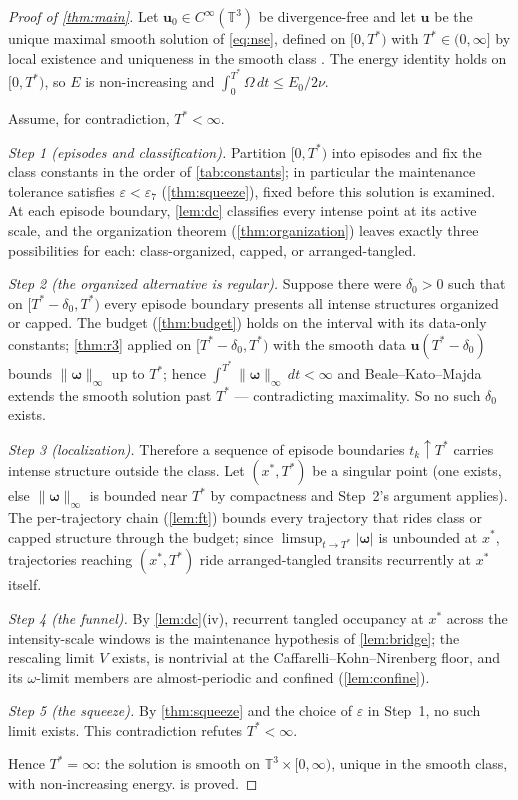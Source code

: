 \documentclass[11pt,letterpaper]{amsart}
\theoremstyle{definition}
\theoremstyle{remark}
\newcommand{\TT}{\mathbb{T}}
\newcommand{\om}{\omega}
\newcommand{\vort}{\boldsymbol{\omega}}
\newcommand{\uu}{\boldsymbol{u}}
\newcommand{\norm}[1]{\lVert #1 \rVert}
\newcommand{\abs}[1]{\lvert #1 \rvert}
\begin{document}
\begin{proof}[Proof of \cref{thm:main}]
Let $\uu_0\in C^\infty(\TT^3)$ be divergence-free and let $\uu$ be the unique maximal
smooth solution of \eqref{eq:nse}, defined on $[0,T^*)$ with $T^*\in(0,\infty]$ by
local existence and uniqueness in the smooth class
\cite{Leray1934,FujitaKato1964,Kato1984}. The energy identity holds on $[0,T^*)$, so
$E$ is non-increasing and $\int_0^{T^*}\Omega\,dt\le E_0/2\nu$.

Assume, for contradiction, $T^*<\infty$.

\emph{Step 1 (episodes and classification).} Partition $[0,T^*)$ into episodes and
fix the class constants in the order of \cref{tab:constants}; in particular the
maintenance tolerance satisfies $\varepsilon<\varepsilon_7$
(\cref{thm:squeeze}), fixed before this solution is examined. At each episode
boundary, \cref{lem:dc} classifies every intense point at its active scale, and the
organization theorem (\cref{thm:organization}) leaves exactly three possibilities for
each: class-organized, capped, or arranged-tangled.

\emph{Step 2 (the organized alternative is regular).} Suppose there were
$\delta_0>0$ such that on $[T^*-\delta_0,T^*)$ every episode boundary presents all
intense structures organized or capped. The budget (\cref{thm:budget}) holds on the
interval with its data-only constants; \cref{thm:r3} applied on
$[T^*-\delta_0,T^*)$ with the smooth data $\uu(T^*-\delta_0)$ bounds
$\norm{\vort}_\infty$ up to $T^*$; hence
$\int^{T^*}\norm{\vort}_\infty\,dt<\infty$ and Beale--Kato--Majda
\cite{BealeKatoMajda1984} extends the smooth solution past $T^*$ --- contradicting
maximality. So no such $\delta_0$ exists.

\emph{Step 3 (localization).} Therefore a sequence of episode boundaries
$t_k\uparrow T^*$ carries intense structure outside the class. Let
$(x^*,T^*)$ be a singular point (one exists, else
$\norm{\vort}_\infty$ is bounded near $T^*$ by compactness and Step~2's argument
applies). The per-trajectory chain (\cref{lem:ft}) bounds every trajectory that rides
class or capped structure through the budget; since
$\limsup_{t\to T^*}\abs{\vort}$ is unbounded at $x^*$, trajectories reaching
$(x^*,T^*)$ ride arranged-tangled transits recurrently at $x^*$ itself.

\emph{Step 4 (the funnel).} By \cref{lem:dc}\textup{(iv)}, recurrent tangled
occupancy at $x^*$ across the intensity-scale windows is the maintenance hypothesis
of \cref{lem:bridge}; the rescaling limit $V$ exists, is nontrivial at the
Caffarelli--Kohn--Nirenberg floor, and its $\om$-limit members are almost-periodic
and confined (\cref{lem:confine}).

\emph{Step 5 (the squeeze).} By \cref{thm:squeeze} and the choice of $\varepsilon$
in Step~1, no such limit exists. This contradiction refutes $T^*<\infty$.

Hence $T^*=\infty$: the solution is smooth on $\TT^3\times[0,\infty)$, unique in the
smooth class, with non-increasing energy.  is proved.
\end{proof}
\end{document}
